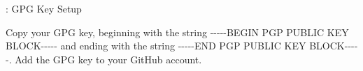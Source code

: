 \justify
\begin{mybox}{\thetcbcounter: GPG Key Setup}
	
\end{mybox}

\justify
Copy your GPG key, beginning with the string
-\/-\/-\/-\/-BEGIN PGP PUBLIC KEY BLOCK-\/-\/-\/-\/- and ending with the string
-\/-\/-\/-\/-END PGP PUBLIC KEY BLOCK-\/-\/-\/-\/-. Add the GPG key to
your GitHub account.
